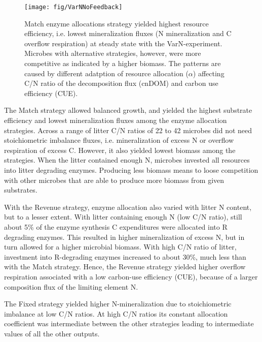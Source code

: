 \begin{figure}[t] \vspace*{2mm}
\begin{center}
\texttt{[image: fig/VarNNoFeedback]}
\end{center}
\caption{
Match enzyme allocations strategy yielded highest resource efficiency, i.e.
lowest mineralization fluxes (N mineralization and C overflow respiration) at
steady state with the VarN-experiment.
Microbes with alternative strategies, however, were more competitive as
indicated by a higher biomass. The patterns are caused by different adatption of
resource allocation ($\alpha$) affecting C/N ratio of the decomposition flux
(cnDOM) and carbon use efficiency (CUE).
\label{fig:VarNNoFeedback}} 
\end{figure}

The Match strategy allowed balanced growth, and yielded the highest substrate
efficiency and lowest mineralization fluxes among the enzyme allocation
strategies. Across a range of litter C/N ratios of 22 to 42 microbes did not
need stoichiometric imbalance fluxes, i.e. mineralization of excess N or
overflow respiration of excess C. However, it also yielded lowest biomass among
the strategies. When the litter contained enough N, microbes invested all
resources into litter degrading enzymes. Producing less biomass means to loose
competition with other microbes that are able to produce more biomass from given
substrates.

With the Revenue strategy, enzyme allocation also varied with litter N content,
but to a lesser extent.
With litter containing enough N (low C/N ratio), still about 5\% of the enzyme
synthesis C expenditures were allocated into R degrading enzymes. This resulted
in higher mineralization of excess N, but in turn allowed for a higher microbial
biomass.
With high C/N ratio of litter, investment into R-degrading enzymes increased to
about 30\%, much less than with the Match strategy. Hence, the Revenue strategy
yielded higher overflow respiration associated with a low carbon-use
efficiency (CUE), because of a larger composition flux of the limiting element
N.

The Fixed strategy yielded higher N-mineralization due to stoichiometric
imbalance at low C/N ratios.
At high C/N ratios its constant allocation coefficient was intermediate between
the other strategies leading to intermediate values of all the other outputs.


